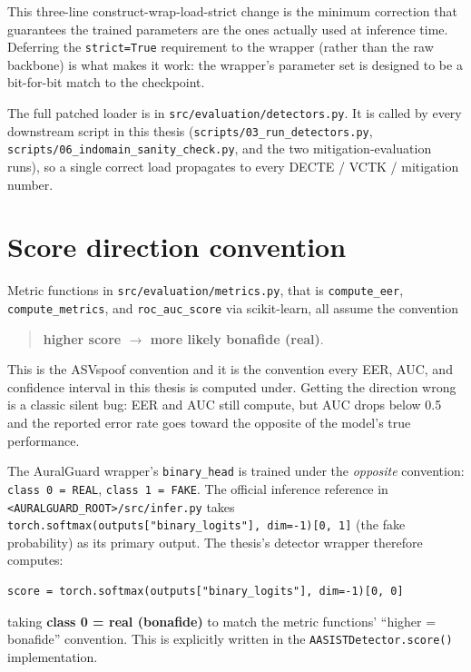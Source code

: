This three-line construct-wrap-load-strict change is the minimum
correction that guarantees the trained parameters are the ones
actually used at inference time. Deferring the \texttt{strict=True}
requirement to the wrapper (rather than the raw backbone) is what
makes it work: the wrapper's parameter set is designed to be a
bit-for-bit match to the checkpoint.

The full patched loader is in \texttt{src/evaluation/detectors.py}.
It is called by every downstream script in this thesis
(\texttt{scripts/03\_run\_detectors.py},
\texttt{scripts/06\_indomain\_sanity\_check.py}, and the two
mitigation-evaluation runs), so a single correct load propagates to
every DECTE / VCTK / mitigation number.


\section{Score direction convention}
\label{sec:detector-verification-score-direction}

Metric functions in \texttt{src/evaluation/metrics.py}, that is
\texttt{compute\_eer}, \texttt{compute\_metrics}, and
\texttt{roc\_auc\_score} via scikit-learn, all assume the convention

\begin{quote}
\textbf{higher score $\rightarrow$ more likely bonafide (real)}.
\end{quote}

This is the ASVspoof convention \cite{Todisco2019_ASVspoof} and it
is the convention every EER, AUC, and confidence interval in this
thesis is computed under. Getting the direction wrong is a classic
silent bug: EER and AUC still compute, but AUC drops below 0.5 and
the reported error rate goes toward the opposite of the model's
true performance.

The AuralGuard wrapper's \texttt{binary\_head} is trained under the
\emph{opposite} convention: \texttt{class 0 = REAL},
\texttt{class 1 = FAKE}. The official inference reference in
\texttt{<AURALGUARD\_ROOT>/src/infer.py} takes
\texttt{torch.softmax(outputs["binary\_logits"], dim=-1)[0, 1]}
(the fake probability) as its primary output. The thesis's detector
wrapper therefore computes:

\begin{verbatim}
score = torch.softmax(outputs["binary_logits"], dim=-1)[0, 0]
\end{verbatim}

taking \textbf{class 0 = real (bonafide)} to match the metric
functions' ``higher = bonafide'' convention. This is explicitly
written in the \texttt{AASISTDetector.score()} implementation.


